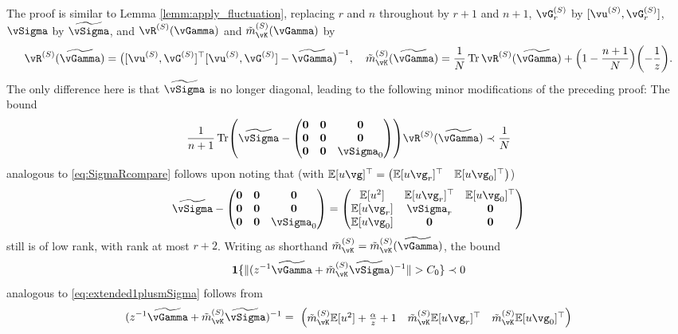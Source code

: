 \begin{proof-of-lemma}[\ref{lemm:apply_fluctuation2}]
The proof is similar to Lemma \ref{lemm:apply_fluctuation}, replacing
$r$ and $n$ throughout by $r+1$ and $n+1$,
$\vG_r^{(S)}$ by $[\vu^{(S)},\vG_r^{(S)}]$,
$\vSigma$ by $\widetilde\vSigma$, and
$\vR^{(S)}(\vGamma)$ and $\tilde m_{\vK}^{(S)}(\vGamma)$ by
\[\vR^{(S)}(\widetilde \vGamma)
=\big([\vu^{(S)},\vG^{(S)}]^\top [\vu^{(S)},\vG^{(S)}]-\widetilde
\vGamma\big)^{-1},
\quad \tilde m_{\vK}^{(S)}(\widetilde \vGamma)
=\frac{1}{N}\Tr \vR^{(S)}(\widetilde
\vGamma)+\Big(1-\frac{n+1}{N}\Big)\left({-}\frac{1}{z}\right).\]
The only difference here is that $\widetilde \vSigma$ is no longer
diagonal, leading to the following minor modifications of the preceding
proof: The bound 
\[\frac{1}{n+1}\Tr\left(\widetilde\vSigma
-\begin{pmatrix} \mathbf{0} & \mathbf{0} & \mathbf{0} \\
\mathbf{0} & \mathbf{0} & \mathbf{0} \\
\mathbf{0} & \mathbf{0} & \vSigma_0 \end{pmatrix}\right)
\vR^{(S)}(\widetilde\vGamma) \prec \frac{1}{N}\]
analogous to \eqref{eq:SigmaRcompare} follows upon noting that
(with $\E[u\vg]^\top=\begin{pmatrix} \E[u\vg_r]^\top & \E[u\vg_0]^\top
\end{pmatrix}$)
\[\widetilde \vSigma-\begin{pmatrix} \mathbf{0} & \mathbf{0} & \mathbf{0} \\
\mathbf{0} & \mathbf{0} & \mathbf{0} \\
\mathbf{0} & \mathbf{0} & \vSigma_0 \end{pmatrix}
=\begin{pmatrix} \E[u^2] & \E[u\vg_r]^\top & \E[u\vg_0]^\top \\
\E[u\vg_r] & \vSigma_r & \mathbf{0} \\
\E[u\vg_0] & \mathbf{0} & \mathbf{0} \end{pmatrix}\]
still is of low rank, with rank at most $r+2$.
Writing as shorthand $\tilde m_{\vK}^{(S)}=\tilde
m_{\vK}^{(S)}(\widetilde \vGamma)$, the bound
	\[\bI\{\|(z^{-1}\widetilde\vGamma+\tilde m_{\vK}^{(S)}
\widetilde\vSigma)^{-1}\|>C_0\} \prec 0\]
analogous to \eqref{eq:extended1plusmSigma} follows from
	\[(z^{-1}\widetilde\vGamma+\tilde m_{\vK}^{(S)}\widetilde\vSigma)^{-1}=~\begin{pmatrix}
        \tilde m_{\vK}^{(S)}\E[u^2]
+\frac{\alpha}{z}+1 & \tilde m_{\vK}^{(S)}
\E[u\vg_r]^\top & \tilde m_{\vK}^{(S)} \E[u\vg_0]^\top \\

\end{pmatrix}\]
\end{proof-of-lemma}
